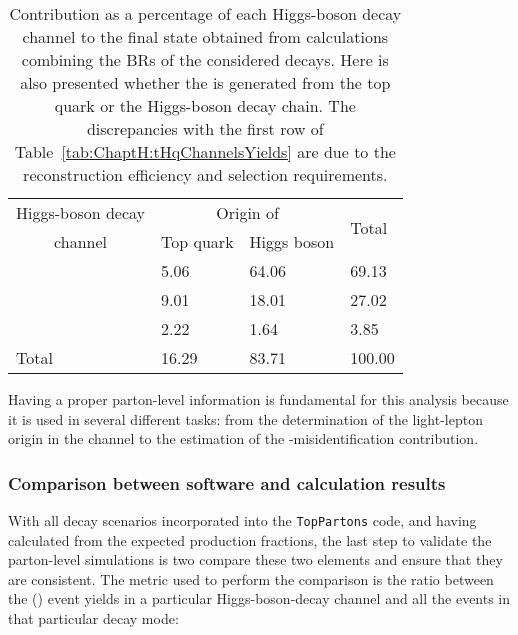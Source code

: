 \begin{table}[h]
\centering
\begin{tabular}{l|ll|l}
\toprule
       \multicolumn{1}{c|}{Higgs-boson decay} 	& \multicolumn{2}{c|}{Origin of \tauhad} &    \multirow{2}{*}{Total}     \\ \cline{2-3}
      \multicolumn{1}{c|}{channel}  		& Top quark        				& Higgs boson       &   \\ \midrule
\Htautau 	& 5.06      					& 64.06        		      			& 69.13	\\
\HWW    	& 9.01         				& 18.01              				& 27.02 	\\
\HZZ    	& 2.22          				& 1.64               				& 3.85   	\\ 
\midrule
Total  	& 16.29           				& 83.71              				& 100.00 	\\
\bottomrule
\end{tabular}
\caption{Contribution as a percentage of each Higgs-boson decay channel to the \dileptau final state obtained
from calculations combining the BRs of the considered decays.
Here is also presented whether the \tauhad is generated from the top quark or the Higgs-boson decay chain.
The discrepancies with the first row of Table~\ref{tab:ChaptH:tHqChannelsYields} are due to the reconstruction efficiency 
and selection requirements.}
\label{tab:ChaptH:TruthSummary}
\end{table}



Having a proper parton-level information is fundamental for this analysis because it is
used in several different tasks: from the determination of the light-lepton origin in
the \dilepSStau channel to the estimation of the \tauhad-misidentification contribution. 

\subsubsection{Comparison between software and calculation results}
With all decay scenarios incorporated into the \texttt{TopPartons} code, and having
calculated from the expected production fractions, the last step to validate the
parton-level simulations is two compare these two elements and ensure that
they are consistent.
The metric used to perform the comparison is the ratio between the \tHq(\dileptau) event yields
 in a particular Higgs-boson-decay channel and all the events in that particular decay mode:  %

